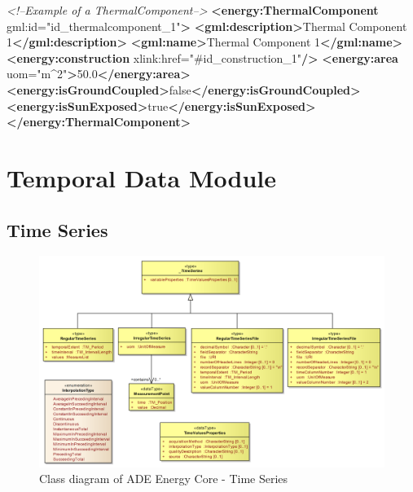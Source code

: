 \documentclass[a4paper,12pt]{article}
\newenvironment{Shaded}{}{}
\newcommand{\KeywordTok}[1]{\textcolor[rgb]{0.00,0.44,0.13}{\textbf{{#1}}}}
\newcommand{\StringTok}[1]{\textcolor[rgb]{0.25,0.44,0.63}{{#1}}}
\newcommand{\CommentTok}[1]{\textcolor[rgb]{0.38,0.63,0.69}{\textit{{#1}}}}
\newcommand{\OtherTok}[1]{\textcolor[rgb]{0.00,0.44,0.13}{{#1}}}
\newcommand{\NormalTok}[1]{{#1}}
\let\stdsection\section%
\renewcommand\section{\newpage\stdsection}
\begin{document}
\begin{Shaded}
\begin{Highlighting}[]
\CommentTok{<!--Example of a ThermalComponent-->}
\KeywordTok{<energy:ThermalComponent}\OtherTok{ gml:id=}\StringTok{"id_thermalcomponent_1"}\KeywordTok{>}
    \KeywordTok{<gml:description>}\NormalTok{Thermal Component 1}\KeywordTok{</gml:description>}
    \KeywordTok{<gml:name>}\NormalTok{Thermal Component 1}\KeywordTok{</gml:name>}
    \KeywordTok{<energy:construction}\OtherTok{ xlink:href=}\StringTok{"#id_construction_1"}\KeywordTok{/>}
    \KeywordTok{<energy:area}\OtherTok{ uom=}\StringTok{"m^2"}\KeywordTok{>}\NormalTok{50.0}\KeywordTok{</energy:area>}
    \KeywordTok{<energy:isGroundCoupled>}\NormalTok{false}\KeywordTok{</energy:isGroundCoupled>}
    \KeywordTok{<energy:isSunExposed>}\NormalTok{true}\KeywordTok{</energy:isSunExposed>}
\KeywordTok{</energy:ThermalComponent>}
\end{Highlighting}
\end{Shaded}

\section{Temporal Data Module}\label{temporal-data-module}

\subsection{Time Series}\label{time-series}

\begin{figure}[htbp]
\centering
\includegraphics{fig/class_time.png}
\caption{Class diagram of ADE Energy Core - Time Series}
\end{figure}
\end{document}
